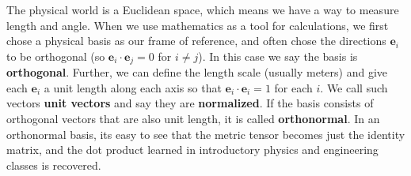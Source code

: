 \documentclass[../master.tex]{subfiles}
\begin{document}
	
	The physical world is a Euclidean space, which means we have a way to measure length and angle. When we use mathematics as a tool for calculations, we first chose a physical basis as our frame of reference, and often chose the directions $\mathbf e_i$ to be orthogonal (so $\mathbf e_i \cdot \mathbf e_j = 0$ for $i \neq j$). In this case we say the basis is \textbf{orthogonal}. Further, we can define the length scale (usually meters) and give each $\mathbf e_i$ a unit length along each axis so that $\mathbf e_i \cdot \mathbf e_i = 1$ for each $i$. We call such vectors \textbf{unit vectors} and say they are \textbf{normalized}. If the basis consists of orthogonal vectors that are also unit length, it is called \textbf{orthonormal}. In an orthonormal basis, its easy to see that the metric tensor becomes just the identity matrix, and the dot product learned in introductory physics and engineering classes is recovered. 
	
	
\end{document}
